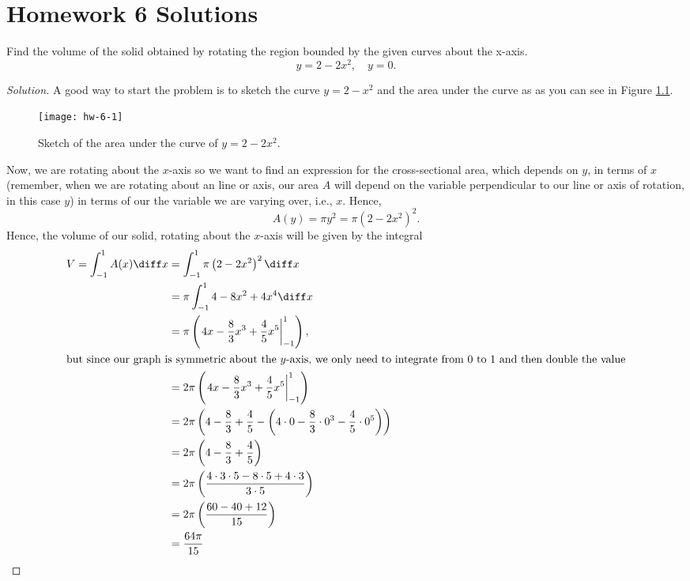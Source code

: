 \chapter{Homework 6 Solutions}
\begin{problem}[WebAssign, HW 6, 1]
Find the volume of the solid obtained by rotating the region bounded by
the given curves about the x-axis.
\[
 y=2-2x^2,\quad y=0.
\]
\end{problem}
\begin{proof}[Solution]
A good way to start the problem is to sketch the curve $y=2-x^2$ and the
area under the curve as as you can see in Figure \ref{fig:hw-6-1}.
\begin{figure}[htbp]
\centering
\texttt{[image: hw-6-1]}
\caption{Sketch of the area under the curve of $y=2-2x^2$.}
\label{fig:hw-6-1}
\end{figure}
Now, we are rotating about the $x$-axis so we want to find an expression
for the cross-sectional area, which depends on $y$, in terms of $x$
(remember, when we are rotating about an line or axis, our area $A$ will
depend on the variable perpendicular to our line or axis of rotation, in
this case $y$) in terms of our the variable we are varying over, i.e.,
$x$. Hence,
\[
  A(y)=\pi y^2=\pi\left(2-2x^2\right)^2.
\]
Hence, the volume of our solid, rotating about the $x$-axis will be given
by the integral
\begin{align*}
V=\int_{-1}^1 A(x)\diff x
&=\int_{-1}^1 \pi\left(2-2x^2\right)^2\diff x\\
&=\pi\int_{-1}^1 4-8x^2+4x^4\diff x\\
&=\pi\left(\left.4x-\frac{8}{3}x^3+\frac{4}{5}x^5\right|_{-1}^1\right),\\
\shortintertext{but since our graph is symmetric about the $y$-axis, we
  only need to integrate from $0$ to $1$ and then double the value}
&=2\pi\left(\left.4x-\frac{8}{3}x^3+\frac{4}{5}x^5\right|_{-1}^1\right)\\
&=2\pi\left(4-\frac{8}{3}+\frac{4}{5}-\left(4\cdot 0-\frac{8}{3}\cdot
  0^3-\frac{4}{5}\cdot 0^5\right)\right)\\
&=2\pi\left(4-\frac{8}{3}+\frac{4}{5}\right)\\
&=2\pi\left(\frac{4\cdot 3\cdot 5-8\cdot 5+4\cdot 3}{3\cdot 5}\right)\\
&=2\pi\left(\frac{60-40+12}{15}\right)\\
&=\frac{64\pi}{15}
\end{align*}
\end{proof}


